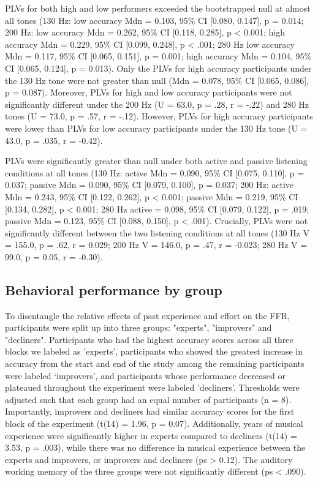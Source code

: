 PLVs for both high and low performers exceeded the bootstrapped null at almost all tones (130 Hz: low accuracy Mdn = 0.103, 95\% CI [0.080, 0.147], p = 0.014; 200 Hz: low accuracy Mdn = 0.262, 95\% CI [0.118, 0.285], p < 0.001; high accuracy Mdn = 0.229, 95\% CI [0.099, 0.248], p < .001; 280 Hz low accuracy Mdn = 0.117, 95\% CI [0.065, 0.151], p = 0.001; high accuracy Mdn = 0.104, 95\% CI [0.065, 0.124], p = 0.013). Only the PLVs for high accuracy participants under the 130 Hz tone were not greater than null (Mdn = 0.078, 95\% CI [0.065, 0.086], p = 0.087). Moreover, PLVs for high and low accuracy participants were not significantly different under the 200 Hz (U = 63.0, p = .28, r = -.22) and 280 Hz tones (U = 73.0, p = .57, r = -.12). However, PLVs for high accuracy participants were lower than PLVs for low accuracy participants under the 130 Hz tone (U = 43.0, p = .035, r = -0.42).

PLVs were significantly greater than null under both active and passive listening conditions at all tones (130 Hz: active Mdn = 0.090, 95\% CI [0.075, 0.110], p = 0.037; passive Mdn = 0.090, 95\% CI [0.079, 0.100], p = 0.037; 200 Hz: active Mdn = 0.243, 95\% CI [0.122, 0.262], p < 0.001; passive Mdn = 0.219, 95\% CI [0.134, 0.282], p < 0.001; 280 Hz active = 0.098, 95\% CI [0.079, 0.122], p = .019; passive Mdn = 0.123, 95\% CI [0.088, 0.150], p < .001). Crucially, PLVs were not significantly different between the two listening conditions at all tones (130 Hz V = 155.0, p = .62, r = 0.029; 200 Hz V = 146.0, p = .47, r = -0.023; 280 Hz V = 99.0, p = 0.05, r = -0.30).


\subsection*{Behavioral performance by group}
To disentangle the relative effects of past experience and effort on the FFR, participants were split up into three groups: "experts", "improvers" and "decliners". Participants who had the highest accuracy scores across all three blocks we labeled as 'experts', participants who showed the greatest increase in accuracy from the start and end of the study among the remaining participants were labeled ‘improvers’, and participants whose performance decreased or plateaued throughout the experiment were labeled 'decliners'. Thresholds were adjusted such that each group had an equal number of participants (n = 8). Importantly, improvers and decliners had similar accuracy scores for the first block of the experiment (t(14) = 1.96, p = 0.07). Additionally, years of musical experience were significantly higher in experts compared to decliners (t(14) = 3.53, p = .003), while there was no difference in musical experience between the experts and improvers, or improvers and decliners (ps > 0.12). The auditory working memory of the three groups were not significantly different (ps < .090).







